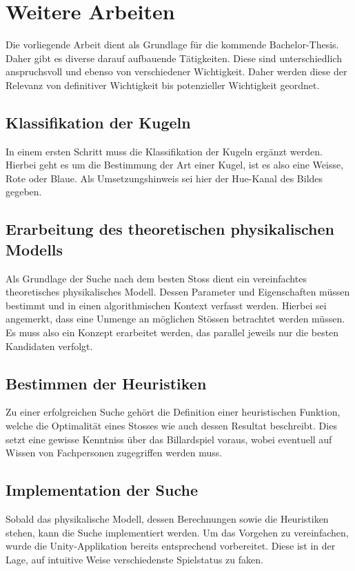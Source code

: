 \chapter{Weitere Arbeiten}
Die vorliegende Arbeit dient als Grundlage für die kommende Bachelor-Thesis. Daher gibt es diverse darauf aufbauende
Tätigkeiten. Diese sind unterschiedlich anspruchsvoll und ebenso von verschiedener Wichtigkeit. Daher werden
diese der Relevanz von definitiver Wichtigkeit bis potenzieller Wichtigkeit geordnet.
\section{Klassifikation der Kugeln}
In einem ersten Schritt muss die Klassifikation der Kugeln ergänzt werden. Hierbei geht es
um die Bestimmung der Art einer Kugel, ist es also eine Weisse, Rote oder Blaue. Als
Umsetzungshinweis sei hier der Hue-Kanal des Bildes gegeben.
\section{Erarbeitung des theoretischen physikalischen Modells}
Als Grundlage der Suche nach dem besten Stoss dient ein vereinfachtes theoretisches physikalisches
Modell. Dessen Parameter und Eigenschaften müssen bestimmt und in einen algorithmischen Kontext
verfasst werden. Hierbei sei angemerkt, dass eine Unmenge an möglichen Stössen betrachtet
werden müssen. Es muss also ein Konzept erarbeitet werden, das parallel jeweils nur
die besten Kandidaten verfolgt.
\section{Bestimmen der Heuristiken}
Zu einer erfolgreichen Suche gehört die Definition einer heuristischen Funktion, welche die
Optimalität eines Stosses wie auch dessen Resultat beschreibt. Dies setzt eine gewisse Kenntniss
über das Billardspiel voraus, wobei eventuell auf Wissen von Fachpersonen zugegriffen werden muss.
\section{Implementation der Suche}
Sobald das physikalische Modell, dessen Berechnungen sowie die Heuristiken stehen, kann die Suche
implementiert werden. Um das Vorgehen zu vereinfachen, wurde die Unity-Applikation bereits
entsprechend vorbereitet. Diese ist in der Lage, auf intuitive Weise verschiedenste Spielstatus zu
faken.
